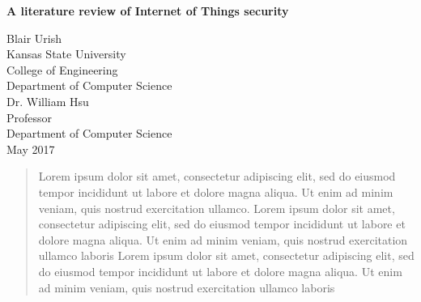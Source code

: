 \documentclass[letterpaper, 12pt]{article}
\begin{document}
\begin{titlepage}
\centering
	\vspace*{5.75cm}
	{\huge\bfseries A literature review of Internet of Things security\par}
	\vspace{2cm}
	Blair Urish\\
	Kansas State University\\
	College of Engineering\\
	Department of Computer Science\\
	\vspace{1cm}
	Dr. William Hsu\\
	Professor\\
	Department of Computer Science\\
	\vspace{1cm}
	May 2017
\end{titlepage}


\begin{abstract}
\thispagestyle{plain}
\setcounter{page}{2}
\begin{flushleft}
	Lorem ipsum dolor sit amet, consectetur adipiscing elit, sed do 
eiusmod tempor incididunt ut labore et dolore magna aliqua. Ut 
enim ad minim veniam, quis nostrud exercitation ullamco. 
Lorem ipsum dolor sit amet, consectetur adipiscing elit, sed do 
eiusmod tempor incididunt ut labore et dolore magna aliqua. Ut 
enim ad minim veniam, quis nostrud exercitation ullamco laboris
Lorem ipsum dolor sit amet, consectetur adipiscing elit, sed do 
eiusmod tempor incididunt ut labore et dolore magna aliqua. Ut 
enim ad minim veniam, quis nostrud exercitation ullamco laboris
\end{flushleft}
\end{abstract}

\newpage
\setcounter{page}{3}
\tableofcontents
\newpage

\cleardoublepage
{}
\listoffigures
\newpage
\end{document}
